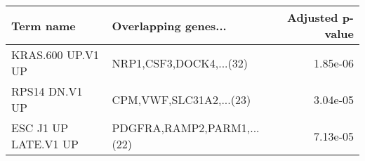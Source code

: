 \begin{tabular}{llr}
\toprule
           Term name &       Overlapping genes... &  Adjusted p-value \\
\midrule
   KRAS.600 UP.V1 UP &    NRP1,CSF3,DOCK4,...(32) &          1.85e-06 \\
      RPS14 DN.V1 UP &    CPM,VWF,SLC31A2,...(23) &          3.04e-05 \\
ESC J1 UP LATE.V1 UP & PDGFRA,RAMP2,PARM1,...(22) &          7.13e-05 \\
\bottomrule
\end{tabular}

